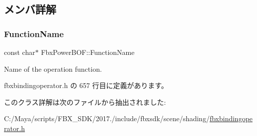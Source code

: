 \subsection{メンバ詳解}
\mbox{\label{class_fbx_power_b_o_f_a1201076a74abe5321aeafafcd4b65f63}} 
\subsubsection{\texorpdfstring{Function\+Name}{FunctionName}}
{\footnotesize\ttfamily const char$\ast$ Fbx\+Power\+B\+O\+F\+::\+Function\+Name\hspace{0.3cm}{\ttfamily [static]}}



Name of the operation function. 



 fbxbindingoperator.\+h の 657 行目に定義があります。



このクラス詳解は次のファイルから抽出されました\+:\begin{DoxyCompactItemize}
\item 
C\+:/\+Maya/scripts/\+F\+B\+X\+\_\+\+S\+D\+K/2017./include/fbxsdk/scene/shading/\hyperlink{fbxbindingoperator_8h}{fbxbindingoperator.\+h}\end{DoxyCompactItemize}
